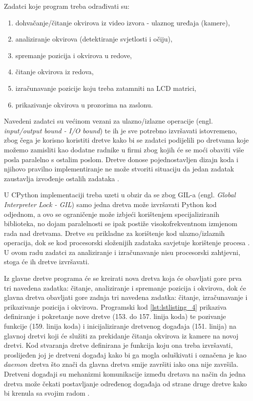 \documentclass{foi}
\begin{document}
\flushleft Zadatci koje program treba odrađivati su:
\begin{enumerate}[noitemsep]
    \item dohvačanje/čitanje okvirova iz video izvora - ulaznog uređaja (kamere),
    \item analiziranje okvirova (detektiranje svjetlosti i očiju),
    \item spremanje pozicija i okvirova u redove,
    \item čitanje okvirova iz redova,
    \item izračunavanje pozicije koju treba zatamniti na LCD matrici,
    \item prikazivanje okvirova u prozorima na zaslonu.
\end{enumerate}

\justifying

Navedeni zadatci su većinom vezani za ulazno/izlazne operacije (engl. \emph{input/output bound - I/O bound}) te ih je sve potrebno izvršavati istovremeno, zbog čega je korisno koristiti dretve kako bi se zadatci podijelili po dretvama koje možemo zamisliti kao dodatne radnike u firmi zbog kojih će se moći obaviti više posla paralelno s ostalim poslom. Dretve donose pojednostavljen dizajn koda i njihovo pravilno implementiranje ne može stvoriti situaciju da jedan zadatak zaustavlja izvođenje ostalih zadataka \cite{AndersonJim}.

U CPython implementaciji treba uzeti u obzir da se zbog GIL-a (engl. \emph{Global Interpreter Lock - GIL}) samo jedna dretva može izvršavati Python kod odjednom, a ovo se ograničenje može izbjeći korištenjem specijaliziranih biblioteka, no dojam paralelnosti se ipak postiže visokofrekventnom izmjenom rada nad dretvama. Dretve su prikladne za korištenje kod ulazno/izlaznih operacija, dok se kod procesorski složenijih zadataka savjetuje korištenje procesa \cite{PythonSoftwareFoundation2}. U ovom radu zadatci za analiziranje i izračunavanje nisu procesorski zahtjevni, stoga će ih dretve izvršavati.

Iz glavne dretve programa će se kreirati nova dretva koja će obavljati gore prva tri navedena zadatka: čitanje, analiziranje i spremanje pozicija i okvirova, dok će glavna dretva obavljati gore zadnja tri navedena zadatka: čitanje, izračunavanje i prikazivanje pozicija i okvirova. Programski kod \ref{lst:lstlisting_4} prikaziva definiranje i pokretanje nove dretve (153. do 157. linija koda) te pozivanje funkcije (159. linija koda) i inicijaliziranje dretvenog događaja (151. linija) na glavnoj dretvi koji će služiti za prekidanje čitanja okvirova iz kamere na novoj dretvi. Kod stvaranja dretve definirana je funkcija koju ona treba izvršavati, proslijeđen joj je dretveni događaj kako bi ga mogla osluškivati i označena je kao $daemon$ dretva što znači da glavna dretva smije završiti iako ona nije završila. Dretveni događaji su mehanizmi komunikacije između dretava na način da jedna dretva može čekati postavljanje određenog događaja od strane druge dretve kako bi krenula sa svojim radom \cite{PythonSoftwareFoundation2}.
\end{document}
